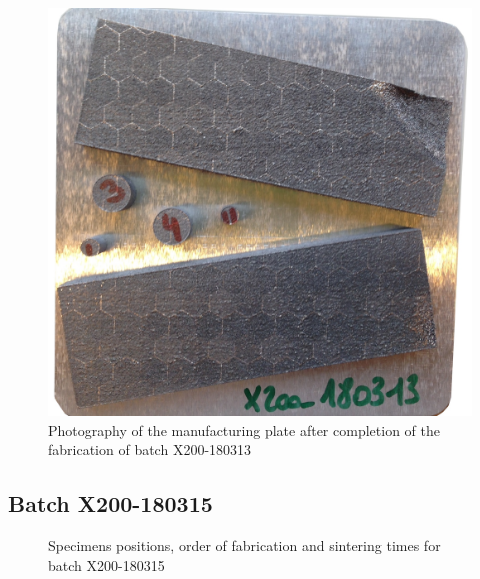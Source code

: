 \begin{figure}[h!]
\centering
\includegraphics[angle=-90,scale=0.22]{Images/180313-real}
\decoRule
\caption[Photography of the manufacturing plate after completion of the fabrication of batch X200-180313]{Photography of the manufacturing plate after completion of the fabrication of batch X200-180313}
\label{fig:180313-real}
\end{figure}

\newpage
\subsection{Batch X200-180315}
\begin{figure}[ht]
\centering
\noindent{}
\decoRule
\caption[Specimens positions, order of fabrication and sintering times for batch X200-180315]{Specimens positions, order of fabrication and sintering times for batch X200-180315}
\label{fig:180315-cad}
\end{figure}

